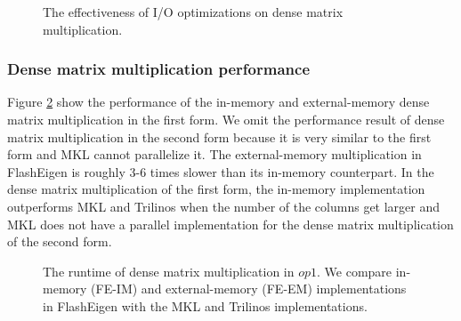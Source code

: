 \begin{figure}
	\begin{center}
		\footnotesize
		\vspace{-15pt}
		
		\vspace{-15pt}
		\caption{The effectiveness of I/O optimizations on dense matrix
		multiplication.}
		\label{perf:dmm_opts}
	\end{center}
\end{figure}

\subsubsection{Dense matrix multiplication performance}

Figure \ref{perf:gemm} show the performance of the in-memory and external-memory
dense matrix multiplication in the first form. We omit the performance result
of dense matrix multiplication in the second form because it is very similar
to the first form and MKL cannot parallelize it.
The external-memory multiplication in FlashEigen is roughly 3-6 times slower
than its in-memory counterpart. In the dense matrix multiplication of
the first form, the in-memory implementation outperforms MKL and Trilinos
when the number of the columns get larger and MKL does not have a parallel
implementation for the dense matrix multiplication of the second form.

\begin{figure}
	\begin{center}
		\footnotesize
		\vspace{-15pt}
		
		\vspace{-15pt}
		\caption{The runtime of dense matrix multiplication in $op1$. We compare
			in-memory (FE-IM) and external-memory (FE-EM) implementations
			in FlashEigen with the MKL and Trilinos implementations.}
		\label{perf:gemm}
	\end{center}
\end{figure}

%		


